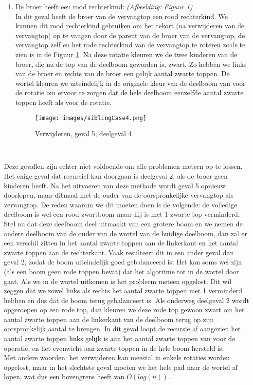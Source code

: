 \documentclass[11pt,a4paper]{report}
\begin{document}
\begin{description}
\begin{enumerate}
\item De broer heeft een rood rechterkind: \textsl{(Afbeelding: Figuur \ref{siblingCase4})}\\
In dit geval heeft de broer van de vervangtop een rood rechterkind. We kunnen dit rood rechterkind gebruiken om het tekort (na verwijderen van de vervangtop) op te vangen door de parent van de broer van de vervangtop, de vervangtop zelf en het rode rechterkind van de vervangtop te roteren zoals te zien is in de Figuur \ref{siblingCase4}. Na deze rotatie kleuren we de twee kinderen van de broer, die nu de top van de deelboom geworden is, zwart. Zo hebben we links van de broer en rechts van de broer een gelijk aantal zwarte toppen. De wortel kleuren we uiteindelijk in de originele kleur van de deelboom van voor de rotatie om ervoor te zorgen dat de hele deelboom eenzelfde aantal zwarte toppen heeft als voor de rotatie.
\begin{figure}[h!]
	\centering
		\texttt{[image: images/siblingCase4.png]}
	\caption{Verwijderen, geval 5, deelgeval 4}
	\label{siblingCase4}
\end{figure}\\
\end{enumerate}

Deze gevallen zijn echter niet voldoende om alle problemen meteen op te lossen. Het enige geval dat recursief kan doorgaan is deelgeval 2, als de broer geen kinderen heeft. Na het uitvoeren van deze methode wordt geval 5 opnieuw doorlopen, maar ditmaal met de ouder van de oorspronkelijke vervangtop als vervangtop. De reden waarom we dit moeten doen is de volgende: de volledige deelboom is wel een rood-zwartboom maar hij is met 1 zwarte top verminderd. Stel nu dat deze deelboom deel uitmaakt van een grotere boom en we nemen de andere deelboom van de ouder van de wortel van de huidige deelboom, dan zal er een verschil zitten in het aantal zwarte toppen aan de linkerkant en het aantal zwarte toppen aan de rechterkant. Vaak resulteert dit in een ander geval dan geval 2, zodat de boom uiteindelijk goed gebalanceerd is. Het kan soms wel zijn (als een boom geen rode toppen bevat) dat het algoritme tot in de wortel door gaat. Als we in de wortel uitkomen is het probleem meteen opgelost. Dit wil zeggen dat we zowel links als rechts het aantal zwarte toppen met 1 verminderd hebben en dus dat de boom terug gebalanceert is. Als onderweg deelgeval 2 wordt opgeroepen op een rode top, dan kleuren we deze rode top gewoon zwart om het aantal zwarte toppen aan de linkerkant van de deelboom terug op zijn oorspronkelijk aantal te brengen. In dit geval loopt de recursie af aangezien het aantal zwarte toppen links gelijk is aan het aantal zwarte toppen van voor de operatie, en het evenwicht aan zwarte toppen in de hele boom hersteld is.\\
Met andere woorden: het verwijderen kan meestal in enkele rotaties worden opgelost, maar in het slechtste geval moeten we het hele pad naar de wortel af lopen, wat dus een bovengrens heeft van $O(log(n))$.
\end{description}
\end{document}
